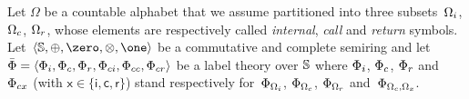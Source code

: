 \noindent
\label{sec:SWVPA-def}
Let $\Omega$ be a countable alphabet 
that we assume partitioned into three 
subsets~$\Omegai$, $\Omegac$, $\Omegar$,
whose elements are respectively called 
\emph{internal}, \emph{call} and \emph{return} symbols.
Let~$\< \Semiring, \oplus, \zero, \otimes, \one>$ be a commutative and complete semiring and let  
$\bar\Phi = \< \Phii, \Phic, \Phir, \Phici, \Phicc, \Phicr>$ 
be a label theory over $\mathbb{S}$
where $\Phii$, $\Phic$, $\Phir$ and~$\Phicx$ (with $\mathsf{x} \in \{ \mathsf{i}, \mathsf{c}, \mathsf{r}\}$) 
stand respectively 
for~$\Phi_\Omegai$, $\Phi_\Omegac$, $\Phi_\Omegar$ and~$\Phi_{\Omegac, \Omega_\mathsf{x}}$.
%

